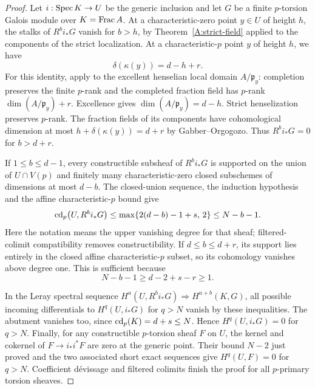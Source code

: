 \begin{proof}
Let $i:\operatorname{Spec} K\to U$ be the generic inclusion and let $G$ be a finite
$p$-torsion Galois module over $K=\operatorname{Frac} A$.
At a characteristic-zero point $y\in U$ of height $h$, the stalks of
$R^b i_*G$ vanish for $b>h$, by
Theorem~\ref{A:strict-field} applied to the components of the strict
localization. At a characteristic-$p$ point $y$ of height $h$, we have
\[
 \delta(\kappa(y))=d-h+r.
\]
For this identity, apply
\citet[Lemmes 2.1.4--2.1.6 and the Cohen-structure calculation in \S4]{A_GO2008}
to the excellent henselian local domain $A/\mathfrak p_y$:
completion preserves the finite $p$-rank and the completed
fraction field has $p$-rank $\dim(A/\mathfrak p_y)+r$.
Excellence gives $\dim(A/\mathfrak p_y)=d-h$.
Strict henselization preserves $p$-rank. The fraction fields of its
components have cohomological dimension at most
$h+\delta(\kappa(y))=d+r$ by Gabber--Orgogozo.
Thus $R^b i_*G=0$ for $b>d+r$.

If $1\leq b\leq d-1$, every constructible subsheaf of $R^b i_*G$
is supported on the union of $U\cap V(p)$ and finitely many
characteristic-zero closed subschemes of dimensions at most $d-b$.
The closed-union sequence, the induction hypothesis and the affine
characteristic-$p$ bound give
\[
 \operatorname{cd}_p\bigl(U,R^b i_*G\bigr)
    \leq\max\{2(d-b)-1+s,\,2\}\leq N-b-1.
\]
Here the notation means the upper vanishing degree for that sheaf;
filtered-colimit compatibility removes constructibility.
If $d\leq b\leq d+r$, its support lies entirely in the closed affine
characteristic-$p$ subset, so its cohomology vanishes above degree one.
This is sufficient because
\[
 N-b-1\geq d-2+s-r\geq1.
\]

In the Leray spectral sequence
$H^a(U,R^b i_*G)\Rightarrow H^{a+b}(K,G)$, all possible incoming
differentials to $H^q(U,i_*G)$ for $q>N$ vanish by these inequalities.
The abutment vanishes too, since $\operatorname{cd}_p(K)=d+s\leq N$.
Hence $H^q(U,i_*G)=0$ for $q>N$.
Finally, for any constructible $p$-torsion sheaf $F$ on $U$, the kernel
and cokernel of $F\to i_*i^*F$ are zero at the generic point. Their
bound $N-2$ just proved and the two associated short exact sequences
give $H^q(U,F)=0$ for $q>N$. Coefficient d\'evissage and filtered
colimits finish the proof for all $p$-primary torsion sheaves.
\end{proof}
